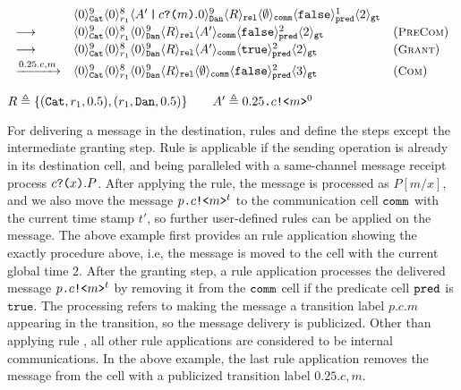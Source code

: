 {\footnotesize
\[
\begin{array}{lll}
&\langle 0 \rangle^{9}_{\texttt{Cat}}\langle 0 \rangle^{8}_{r_1}
\langle A'\,\texttt{|}\,c\texttt{?(}m\texttt{)}.0 \rangle^{9}_{\texttt{Dan}} 
\langle R \rangle_{\texttt{rel}}
\langle \emptyset \rangle_{\texttt{comm}}
\langle \texttt{false} \rangle^{1}_{\texttt{pred}}
\langle 2 \rangle_{\texttt{gt}}
\\[0.2em]
\longrightarrow
&
\langle 0 \rangle^{9}_{\texttt{Cat}}\langle 0 \rangle^{8}_{r_1}
\langle 0 \rangle^{9}_{\texttt{Dan}} 
\langle R \rangle_{\texttt{rel}}
\langle A' \rangle_{\texttt{comm}}
\langle \texttt{false} \rangle^{2}_{\texttt{pred}}
\langle 2 \rangle_{\texttt{gt}}
&
({\small \textsc{PreCom}})
\\[0.2em]
\longrightarrow
&
\langle 0 \rangle^{9}_{\texttt{Cat}}\langle 0 \rangle^{8}_{r_1}
\langle 0 \rangle^{9}_{\texttt{Dan}} 
\langle R \rangle_{\texttt{rel}}
\langle A' \rangle_{\texttt{comm}}
\langle \texttt{true} \rangle^{2}_{\texttt{pred}}
\langle 2 \rangle_{\texttt{gt}}
&
({\small \textsc{Grant}})
\\[0.2em]
\xrightarrow{0.25.c,m}
&
\langle 0 \rangle^{9}_{\texttt{Cat}}\langle 0 \rangle^{8}_{r_1}
\langle 0 \rangle^{9}_{\texttt{Dan}} 
\langle R \rangle_{\texttt{rel}}
\langle \emptyset \rangle_{\texttt{comm}}
\langle \texttt{false} \rangle^{2}_{\texttt{pred}}
\langle 3 \rangle_{\texttt{gt}}
&
({\small \textsc{Com}})
\end{array}
\]
}
{\footnotesize
\begin{center}
$R\triangleq\{(\texttt{Cat},r_1,0.5), (r_1,\texttt{Dan},0.5)\}
\qquad
A'\triangleq0.25\texttt{.}c\texttt{!<}m\texttt{>}^0$
\end{center}
}

For delivering a message in the destination,
rules  and  define the steps except the intermediate granting step.
Rule  is applicable if the sending operation is already in its destination cell, and being paralleled with a same-channel message receipt process $c\texttt{?(}x\texttt{)}.P$. After applying the rule, the message is processed as $P[m/x]$, and we also move the message $p\texttt{.}c\texttt{!<}m\texttt{>}^t$ to the communication cell $\texttt{comm}$ with the current time stamp $t'$, so further user-defined rules can be applied on the message.
The above example first provides an  rule application showing the exactly procedure above, i.e, the message is moved to the  cell with the current global time $2$.
After the granting step,
a  rule application processes the delivered message $p\texttt{.}c\texttt{!<}m\texttt{>}^t$ by removing it from the $\texttt{comm}$ cell if the predicate cell $\texttt{pred}$ is $\texttt{true}$. The processing refers to making the message a transition label $p.c.m$ appearing in the transition,
so the message delivery is publicized. Other than applying rule , all other rule applications are considered to be internal communications. 
In the above example, the last  rule application removes the message from the cell with a publicized transition label $0.25.c,m$. 

